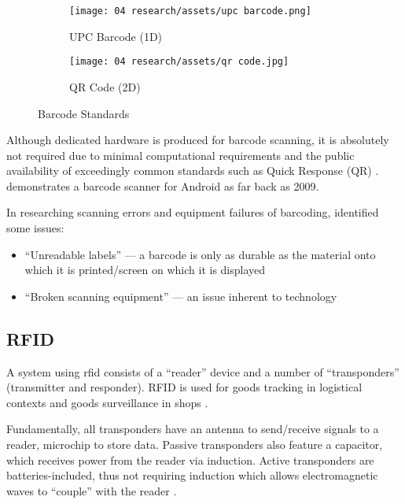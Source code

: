 \begin{figure}[h]
  \centering
  \begin{subfigure}{\subfigwidth}
    \centering
    \texttt{[image: 04
      research/assets/upc barcode.png]}
    \caption{UPC Barcode (1D)}
    \parencite{img:upcBarcode}
  \end{subfigure}
  \begin{subfigure}{\subfigwidth}
    \centering
    \texttt{[image: 04
      research/assets/qr code.jpg]}
    \caption{QR Code (2D)}
    \parencite{img:qrCode}
  \end{subfigure}

  \caption{Barcode Standards}
  \label{fig:barcodes}
\end{figure}

Although dedicated hardware is produced for barcode
scanning, it is absolutely not required due to minimal
computational requirements and the public availability of
exceedingly common standards such as Quick Response (QR)
\parencite{qrCodeStandard}.
\cite{androidBarcodeScanner} demonstrates a barcode scanner
for Android as far back as 2009.

In researching scanning errors and equipment failures of
barcoding, \cite{barcodeRfidComparison} identified some
issues: 

\begin{itemize} 

  \item \enquote{Unreadable labels} --- a barcode is only as
        durable as the material onto which it is printed/screen on
        which it is displayed 

  \item \enquote{Broken scanning equipment} --- an issue
        inherent to technology 

\end{itemize} 

\subsection{RFID} \label{ss:rfid} 

A system using \gls{rfid} consists of a \enquote{reader}
device and a number of \enquote{transponders} (transmitter
and responder).
RFID is used for goods tracking in logistical contexts and
goods surveillance in shops \parencite{whatIsRfid}.

Fundamentally, all transponders have an antenna to
send/receive signals to a reader, microchip to store data.
Passive transponders also feature a capacitor, which
receives power from the reader via induction.
Active transponders are batteries-included, thus not
requiring induction which allows electromagnetic waves to
\enquote{couple} with the reader \parencite{whatIsRfid}.

